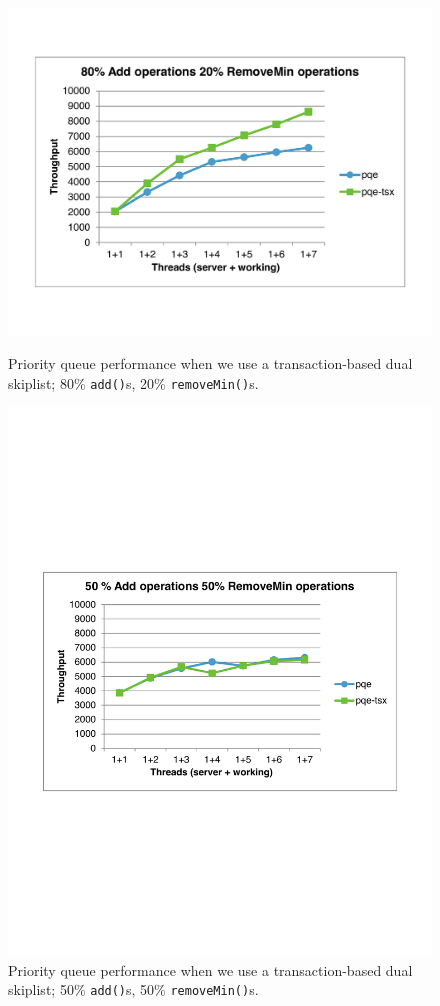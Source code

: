 \begin{figure}[htb]
\centering
\begin{minipage}{.495\textwidth}
	\centering
  \includegraphics[width=\linewidth]{img/tsx-80-20.pdf}
\caption{Priority queue performance when we use a transaction-based dual skiplist; 80\% \texttt{add()}s, 20\% \texttt{removeMin()}s.}
\label{fig:tsx1}
\end{minipage}%
\hfill%
\begin{minipage}{.495\textwidth}
	\centering
  \includegraphics[width=\linewidth]{img/tsx-50-50.pdf}
\caption{Priority queue performance when we use a transaction-based dual skiplist; 50\% \texttt{add()}s, 50\% \texttt{removeMin()}s.}
\label{fig:tsx2}
\end{minipage}
\end{figure}
